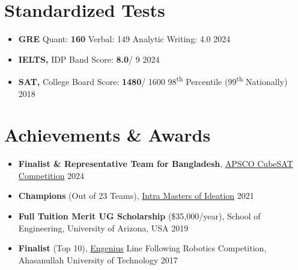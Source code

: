 \documentclass[11pt,a4paper]{article}
\begin{document}
\section*{Standardized Tests}

\begin{itemize}
  \item 
  \textbf{GRE} 
  \hspace{6.67cm}
  \textbullet{} Quant: \textbf{160} \textbullet{} Verbal: 149 \textbullet{} Analytic Writing: 4.0 \hfill {\footnotesize 2024}
  \item 
  \textbf{IELTS, }{IDP} 
  \hspace{5.64cm} 
  \textbullet{} Band Score: \textbf{8.0}/ 9 
  \hfill 
  {\footnotesize 2024}
  \item 
  \textbf{SAT,} {College Board} 
  \hspace{4.38cm}
  \textbullet{} Score: \textbf{1480}/ 1600 
  \hspace{0cm}
  \textbullet{} 98\textsuperscript{th} Percentile (99\textsuperscript{th} Nationally) \hfill {\footnotesize 2018}
\end{itemize}

\section*{Achievements \& Awards}

\begin{itemize}
  \item 
  \textbf{Finalist \& Representative Team for Bangladesh}, 
  {\href{https://www.gtu.edu.tr/fileman/Files/UserFiles/malzeme/APSCO%20Cubesat%20Competition%20(ACC).pdf}
  {APSCO CubeSAT Competition}} \hfill 
  {\footnotesize{2024}}
  
  \item
  \textbf{Champions} (Out of 23 Teams), {\href{https://www.facebook.com/photo?fbid=10159043579170768&set=a.10159043554910768}{Intra Masters of Ideation}} \hfill {\footnotesize{2021}}
  
  \item 
  \textbf{Full Tuition Merit UG Scholarship} (\$35,000/year), School of Engineering, University of Arizona, USA
  \hfill {\footnotesize{2019}}
  
  \item 
  \textbf{Finalist} (Top 10), {\href{https://www.facebook.com/EngeniusAUST}{Engenius}} {Line Following Robotics Competition}, Ahasanullah University of Technology
  \hfill {\footnotesize{2017}}
  
\end{itemize}
\end{document}
